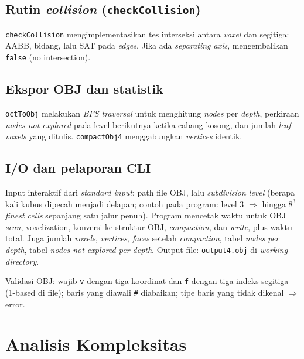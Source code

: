 \documentclass[11pt,a4paper]{article}
\begin{document}
\subsection{Rutin \textit{collision} (\texttt{checkCollision})}

\texttt{checkCollision} mengimplementasikan tes interseksi antara \textit{voxel} dan segitiga: AABB, bidang, lalu SAT pada \textit{edges}. Jika ada \textit{separating axis}, mengembalikan \texttt{false} (no intersection).

\subsection{Ekspor OBJ dan statistik}

\texttt{octToObj} melakukan \textit{BFS traversal} untuk menghitung \textit{nodes} per \textit{depth}, perkiraan \textit{nodes not explored} pada level berikutnya ketika cabang kosong, dan jumlah \textit{leaf voxels} yang ditulis. \texttt{compactObj4} menggabungkan \textit{vertices} identik.

\subsection{I/O dan pelaporan CLI}

Input interaktif dari \textit{standard input}: path file OBJ, lalu \textit{subdivision level} (berapa kali kubus dipecah menjadi delapan; contoh pada program: level 3 $\Rightarrow$ hingga $8^3$ \textit{finest cells} sepanjang satu jalur penuh). Program mencetak waktu untuk OBJ \textit{scan}, voxelization, konversi ke struktur OBJ, \textit{compaction}, dan \textit{write}, plus waktu total. Juga jumlah \textit{voxels}, \textit{vertices}, \textit{faces} setelah \textit{compaction}, tabel \textit{nodes per depth}, tabel \textit{nodes not explored per depth}. Output file: \texttt{output4.obj} di \textit{working directory}.

Validasi OBJ: wajib \texttt{v} dengan tiga koordinat dan \texttt{f} dengan tiga indeks segitiga (1-based di file); baris yang diawali \texttt{\#} diabaikan; tipe baris yang tidak dikenal $\Rightarrow$ error.

\section{Analisis Kompleksitas}
\end{document}
